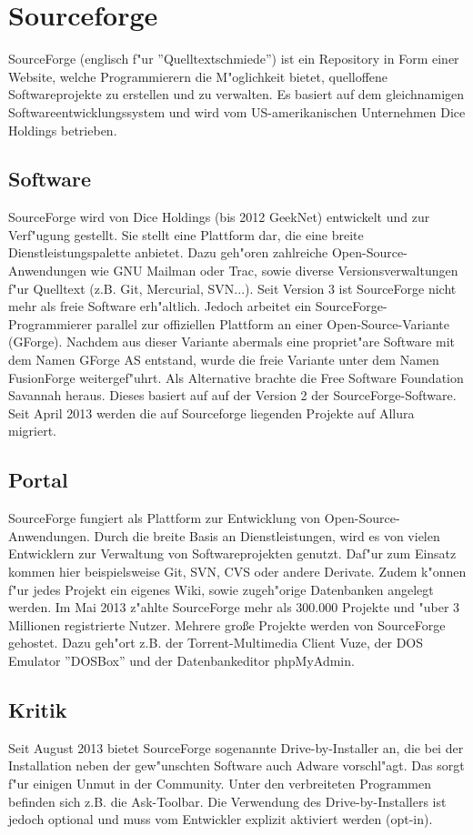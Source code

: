 \section{Sourceforge}
SourceForge (englisch f"ur ''Quelltextschmiede'') ist ein Repository in Form einer Website,
welche Programmierern die M"oglichkeit bietet, quelloffene Softwareprojekte zu erstellen und zu verwalten. 
Es basiert auf dem gleichnamigen Softwareentwicklungssystem und wird vom US-amerikanischen Unternehmen 
Dice Holdings betrieben.
\subsection{Software}
SourceForge wird von Dice Holdings (bis 2012 GeekNet) entwickelt und zur Verf"ugung gestellt.
Sie stellt eine Plattform dar, die eine breite Dienstleistungspalette anbietet. Dazu geh"oren zahlreiche Open-Source-Anwendungen
wie GNU Mailman oder Trac, sowie diverse Versionsverwaltungen f"ur Quelltext (z.B. Git, Mercurial, SVN...).
Seit Version 3 ist SourceForge nicht mehr als freie Software erh"altlich. Jedoch arbeitet ein SourceForge-Programmierer
parallel zur offiziellen Plattform an einer Open-Source-Variante (GForge). Nachdem aus dieser Variante 
abermals eine propriet"are Software mit dem Namen GForge AS entstand, wurde die freie Variante unter dem Namen FusionForge
weitergef"uhrt. Als Alternative brachte die Free Software Foundation Savannah heraus. Dieses basiert auf
auf der Version 2 der SourceForge-Software.
Seit April 2013 werden die auf Sourceforge liegenden Projekte auf Allura migriert.
\subsection{Portal}
SourceForge fungiert als Plattform zur Entwicklung von Open-Source-Anwendungen. Durch die breite Basis an
Dienstleistungen, wird es von vielen Entwicklern zur Verwaltung von Softwareprojekten genutzt. Daf"ur zum Einsatz kommen
hier beispielsweise Git, SVN, CVS oder andere Derivate. Zudem k"onnen f"ur jedes Projekt
ein eigenes Wiki, sowie zugeh"orige Datenbanken angelegt werden. Im Mai 2013 z"ahlte SourceForge
mehr als 300.000 Projekte und "uber 3 Millionen registrierte Nutzer.
Mehrere große Projekte werden von SourceForge gehostet. Dazu geh"ort z.B. der Torrent-Multimedia Client Vuze,
der DOS Emulator ''DOSBox'' und der Datenbankeditor phpMyAdmin.
\subsection{Kritik}
Seit August 2013 bietet SourceForge sogenannte Drive-by-Installer an, die bei der Installation 
neben der gew"unschten Software auch Adware vorschl"agt. Das sorgt f"ur einigen Unmut in der Community. 
Unter den verbreiteten Programmen befinden sich z.B. die Ask-Toolbar. Die Verwendung des
Drive-by-Installers ist jedoch optional und muss vom Entwickler explizit aktiviert werden (opt-in).

